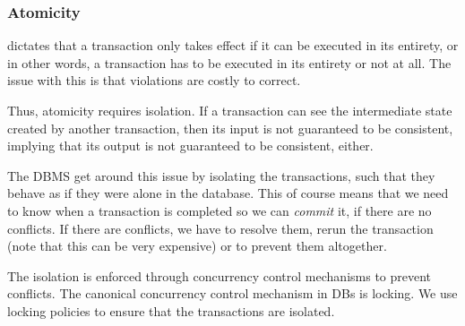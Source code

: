 \subsubsection{Atomicity}
\inlinedefinition[Atomicity] dictates that a transaction only takes effect if it can be executed in its entirety, or in other words,
a transaction has to be executed in its entirety or not at all.
The issue with this is that violations are costly to correct.

Thus, atomicity requires isolation. If a transaction can see the intermediate state created by another transaction, then its input is not guaranteed to be consistent,
implying that its output is not guaranteed to be consistent, either.

The DBMS get around this issue by isolating the transactions, such that they behave as if they were alone in the database.
This of course means that we need to know when a transaction is completed so we can \textit{commit} it, if there are no conflicts.
If there are conflicts, we have to resolve them, rerun the transaction (note that this can be very expensive) or to prevent them altogether.

The isolation is enforced through concurrency control mechanisms to prevent conflicts.
The canonical concurrency control mechanism in DBs is locking.
We use locking policies to ensure that the transactions are isolated.
